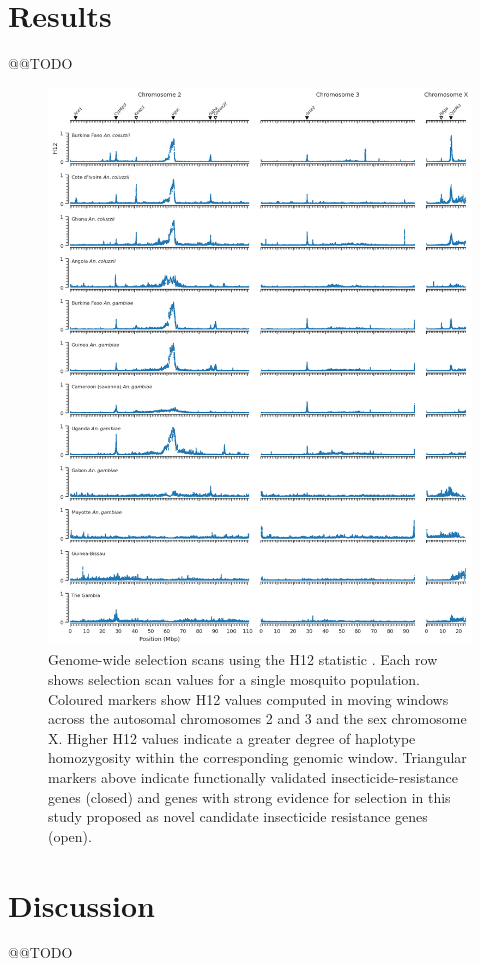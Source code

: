 \documentclass[a4paper,11pt,abstracton,hidelinks]{scrartcl}
\begin{document}
\section*{Results}

@@TODO

\begin{figure}[t!]
	\begin{center}
		\includegraphics*[width=1.05\linewidth,center]{artwork/fig_h12_filter_simple.png}
	\end{center}
	\caption{
%	
Genome-wide selection scans using the H12 statistic \citep{Garud2015}.
%
Each row shows selection scan values for a single mosquito population.
%
Coloured markers show H12 values computed in moving windows across the autosomal chromosomes 2 and 3 and the sex chromosome X.
%
Higher H12 values indicate a greater degree of haplotype homozygosity within the corresponding genomic window. 
%
Triangular markers above indicate functionally validated insecticide-resistance genes (closed) and genes with strong evidence for selection in this study proposed as novel candidate insecticide resistance genes (open).
%
}
	\label{fig:h12}
\end{figure}


\section*{Discussion}

@@TODO


\printbibliography
\end{document}
